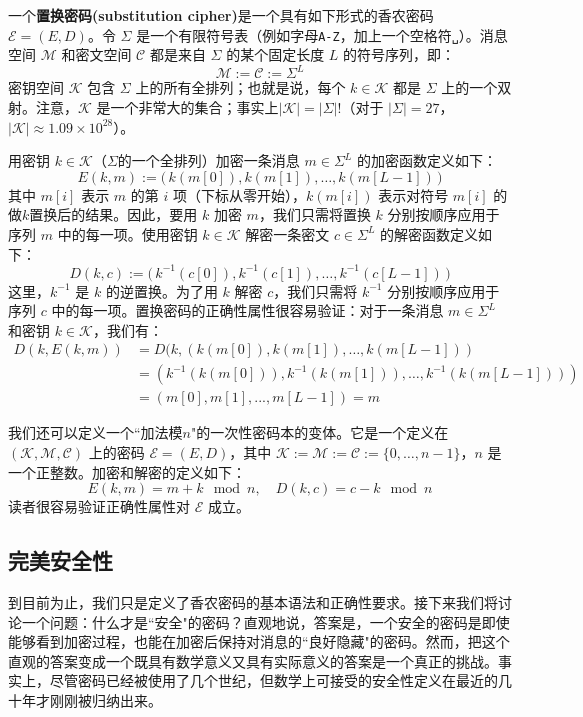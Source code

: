 \begin{example}\label{exmp:2-3}
一个\textbf{置换密码(substitution cipher)}是一个具有如下形式的香农密码 $\mathcal{E}=(E,D)$。令 $\Sigma$ 是一个有限符号表（例如字母\texttt{A-Z}，加上一个空格符\texttt{␣}）。消息空间 $\mathcal{M}$ 和密文空间 $\mathcal{C}$ 都是来自 $\Sigma$ 的某个固定长度 $L$ 的符号序列，即：
$$
\mathcal{M}:=\mathcal{C}:=\Sigma^L
$$
密钥空间 $\mathcal{K}$ 包含 $\Sigma$ 上的所有全排列；也就是说，每个 $k\in\mathcal{K}$ 都是 $\Sigma$ 上的一个双射。注意，$\mathcal{K}$ 是一个非常大的集合；事实上$|\mathcal{K}|=|\Sigma|!$（对于 $|\Sigma|=27$，$|\mathcal{K}|\approx 1.09\times10^{28}$）。

用密钥 $k\in\mathcal{K}$（$\Sigma$的一个全排列）加密一条消息 $m\in\Sigma^L$ 的加密函数定义如下：
$$
E(k,m):=
\big(
\,
k(m[0]),k(m[1]),\dots,k(m[L-1])
\,
\big)
$$
其中 $m[i]$ 表示 $m$ 的第 $i$ 项（下标从零开始），$k(m[i])$ 表示对符号 $m[i]$ 的做$k$置换后的结果。因此，要用 $k$ 加密 $m$，我们只需将置换 $k$ 分别按顺序应用于序列 $m$ 中的每一项。使用密钥 $k\in\mathcal{K}$ 解密一条密文 $c\in\Sigma^L$ 的解密函数定义如下：
$$
D(k,c):=
\big(
\,
k^{-1}(c[0]),k^{-1}(c[1]),\dots,k^{-1}(c[L-1])
\,
\big)
$$
这里，$k^{-1}$ 是 $k$ 的逆置换。为了用 $k$ 解密 $c$，我们只需将 $k^{-1}$ 分别按顺序应用于序列 $c$ 中的每一项。置换密码的正确性属性很容易验证：对于一条消息 $m\in\Sigma^L$ 和密钥 $k\in\mathcal{K}$，我们有：
$$
\begin{aligned}
D(k,E(k,m))
&=D(k,(k(m[0]),k(m[1]),\dots,k(m[L−1]))\\
&=(k^{−1}(k(m[0])),k^{−1}(k(m[1])),\dots,k^{−1}(k(m[L−1])))\\
& =(m[0],m[1],...,m[L−1])=m
\end{aligned}
$$
\end{example}

\begin{example}[加性一次性密码本]\label{exmp:2-4}
我们还可以定义一个``加法模$n$"的一次性密码本的变体。它是一个定义在 $(\mathcal{K},\mathcal{M},\mathcal{C})$ 上的密码 $\mathcal{E}=(E,D)$，其中 $\mathcal{K}:=\mathcal{M}:=\mathcal{C}:=\{0,\dots,n-1\}$，$n$ 是一个正整数。加密和解密的定义如下：
$$
E(k,m)=m+k \mod n,
\quad
D(k,c)=c-k \mod n
$$
读者很容易验证正确性属性对 $\mathcal{E}$ 成立。
\end{example}

\subsection{完美安全性}

到目前为止，我们只是定义了香农密码的基本语法和正确性要求。接下来我们将讨论一个问题：什么才是``安全"的密码？直观地说，答案是，一个安全的密码是即使能够看到加密过程，也能在加密后保持对消息的``良好隐藏"的密码。然而，把这个直观的答案变成一个既具有数学意义又具有实际意义的答案是一个真正的挑战。事实上，尽管密码已经被使用了几个世纪，但数学上可接受的安全性定义在最近的几十年才刚刚被归纳出来。

